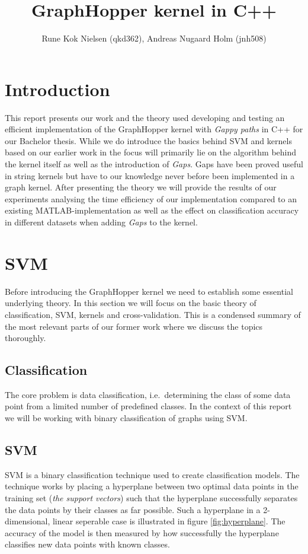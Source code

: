 \documentclass{article}
\author{Rune Kok Nielsen (qkd362), Andreas Nugaard Holm (jnh508)}
\title{GraphHopper kernel in C++}
\begin{document}
	
\maketitle
\newpage
\tableofcontents
\newpage

\section{Introduction}
This report presents our work and the theory used developing and testing an efficient implementation of the GraphHopper kernel with \textit{Gappy paths} in C++ for our Bachelor thesis. While we do introduce the basics behind SVM and kernels based on our earlier work in \cite{svm-graph-kernels} the focus will primarily lie on the algorithm behind the kernel itself as well as the introduction of \textit{Gaps}. Gaps have been proved useful in string kernels but have to our knowledge never before been implemented in a graph kernel. After presenting the theory we will provide the results of our experiments analysing the time efficiency of our implementation compared to an existing MATLAB-implementation as well as the effect on classification accuracy in different datasets when adding \textit{Gaps} to the kernel.

\section{SVM}
Before introducing the GraphHopper kernel we need to establish some essential underlying theory. In this section we will focus on the basic theory of classification, SVM, kernels and cross-validation. This is a condensed summary of the most relevant parts of our former work \cite{svm-graph-kernels} where we discuss the topics thoroughly.

\subsection{Classification}
The core problem is data classification, i.e.\ determining the class of some data point from a limited number of predefined classes. In the context of this report we will be working with binary classification of graphs using SVM.

\subsection{SVM}
SVM is a binary classification technique used to create classification models. The technique works by placing a hyperplane between two optimal data points in the training set (\textit{the support vectors}) such that the hyperplane successfully separates the data points by their classes as far possible. Such a hyperplane in a 2-dimensional, linear seperable case is illustrated in figure \ref{fig:hyperplane}. The accuracy of the model is then measured by how successfully the hyperplane classifies new data points with known classes.
\end{document}
